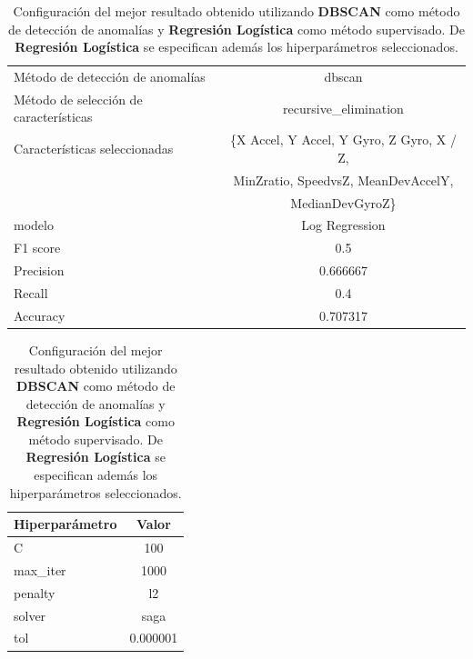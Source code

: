 \begin{appendices}
		\begin{table}[htb]
			\centering
			\caption{Configuración del mejor resultado obtenido utilizando \textbf{DBSCAN} como método de detección de anomalías y \textbf{Regresión Logística}
			como método supervisado. De \textbf{Regresión Logística} se especifican además los hiperparámetros seleccionados.}
			\label{table:31}
			\begin{tabular}{lc}
				\toprule
					  Método de detección de anomalías &                                             dbscan \\
				Método de selección de características &                              recursive\_elimination \\
						 Características seleccionadas & \{X Accel, Y Accel, Y Gyro, Z Gyro, X / Z, \\ 
						 							   &    MinZratio, SpeedvsZ, MeanDevAccelY,\\
													   &  MedianDevGyroZ\} \\
												modelo &                                     Log Regression \\
											  F1 score &                                                0.5 \\
											 Precision &                                           0.666667 \\
												Recall &                                                0.4 \\
											  Accuracy &                                           0.707317 \\
				\bottomrule
				\end{tabular}
			\newline
			\newline

			\begin{tabular}{lc}
				\toprule
				Hiperparámetro &     Valor \\
				\midrule
							 C &       100 \\
					  max\_iter &      1000 \\
					   penalty &        l2 \\
						solver &      saga \\
						   tol &  0.000001 \\
				\bottomrule
			\end{tabular}
			
		\end{table}


\end{appendices}
